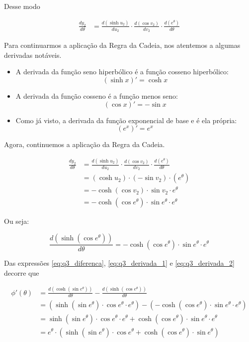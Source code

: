 \documentclass{article}
\begin{document}
Desse modo

\begin{align*}
    \frac{dy_2}{d \theta}
     & = \frac{d(\sinh u_2)}{du_2} \cdot \frac{d(\cos v_2)}{dv_2} \cdot \frac{d(e^{\theta})}{d \theta}
\end{align*}

Para continuarmos a aplicação da Regra da Cadeia,
nos atentemos a algumas derivadas notáveis.

\begin{itemize}
    \item A derivada da função seno hiperbólico é a função cosseno hiperbólico:
          \[
              (\sinh x)' = \cosh x
          \]
    \item A derivada da função cosseno é a função menos seno:
          \[
              (\cos x)' = -\sin x
          \]
    \item Como já visto, a derivada da função exponencial de base e é ela própria:
          \[
              (e^x)' = e^x
          \]
\end{itemize}

Agora, continuemos a aplicação da Regra da Cadeia.

\begin{align*}
    \frac{dy_2}{d \theta}
     & =
    \frac{d(\sinh u_2)}{du_2} \cdot
    \frac{d(\cos v_2)}{dv_2} \cdot
    \frac{d(e^{\theta})}{d \theta}
    \\ & =
    (\cosh u_2) \cdot
    (-\sin v_2) \cdot
    (e^{\theta})
    \\ & =
    -
    \cosh (\cos v_2) \cdot
    \sin v_2 \cdot
    e^{\theta}
    \\ & =
    -
    \cosh (\cos e^{\theta}) \cdot
    \sin e^{\theta} \cdot
    e^{\theta}
\end{align*}

Ou seja:

\begin{equation}\label{eq:q3_derivada_2}
    \frac{d(\sinh(\cos e^{\theta}))}{d\theta}
    =
    -
    \cosh (\cos e^{\theta}) \cdot
    \sin e^{\theta} \cdot
    e^{\theta}
\end{equation}

Das expressões
\ref{eq:q3_diferenca},
\ref{eq:q3_derivada_1} e
\ref{eq:q3_derivada_2}
decorre que

\begin{align*}
    \phi'(\theta)
     & =
    \frac{d(\cosh(\sin e^{\theta}))}{d\theta}
    - \frac{d(\sinh(\cos e^{\theta}))}{d\theta}
    \\ &=
    (
    \sinh (\sin e^{\theta}) \cdot
    \cos e^{\theta} \cdot
    e^{\theta}
    )
    -
    (
    -
    \cosh (\cos e^{\theta}) \cdot
    \sin e^{\theta} \cdot
    e^{\theta}
    )
    \\ &=
    \sinh (\sin e^{\theta}) \cdot
    \cos e^{\theta} \cdot
    e^{\theta}
    +
    \cosh (\cos e^{\theta}) \cdot
    \sin e^{\theta} \cdot
    e^{\theta}
    \\ &=
    e^{\theta}
    \cdot
    (
    \sinh (\sin e^{\theta}) \cdot
    \cos e^{\theta}
    +
    \cosh (\cos e^{\theta}) \cdot
    \sin e^{\theta}
    )
\end{align*}
\end{document}
